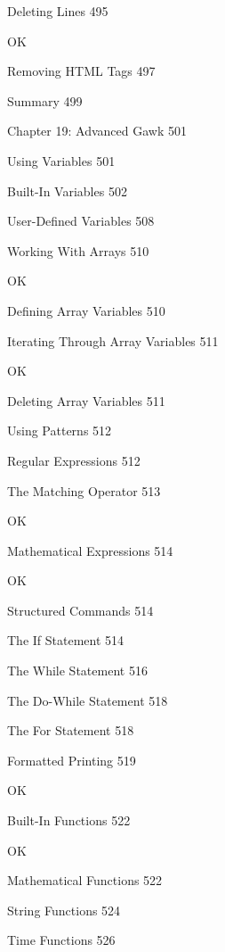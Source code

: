 Deleting Lines 495

OK

Removing HTML Tags 497



Summary 499



Chapter 19: Advanced Gawk 501



Using Variables 501



Built-In Variables 502



User-Defined Variables 508



Working With Arrays 510

OK

Defining Array Variables 510



Iterating Through Array Variables 511

OK

Deleting Array Variables 511



Using Patterns 512



Regular Expressions 512



The Matching Operator 513

OK

Mathematical Expressions 514

OK

Structured Commands 514



The If Statement 514



The While Statement 516



The Do-While Statement 518



The For Statement 518



Formatted Printing 519

OK

Built-In Functions 522

OK

Mathematical Functions 522



String Functions 524



Time Functions 526



